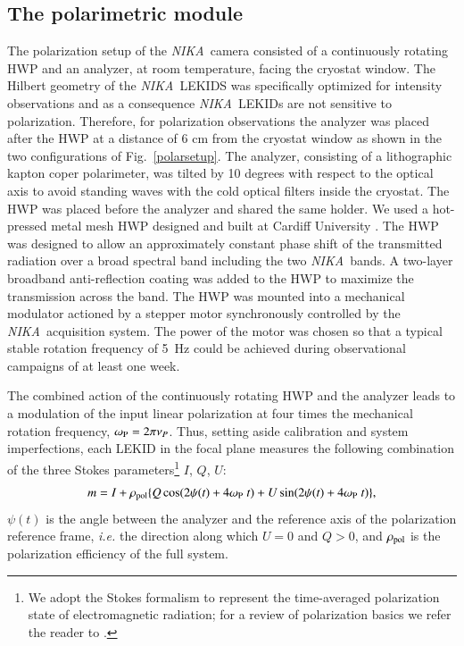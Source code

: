 \documentclass[twocolumn, traditabstract]{aa}
\newcommand{\nika}{{\it NIKA}}
\begin{document}
\subsection{The polarimetric module}
\label{sec:pol_module}
The polarization setup of the \nika\ camera consisted of a continuously rotating
HWP and an analyzer, at room temperature, facing the cryostat window. The
Hilbert geometry \citep{roesch} of the \nika\ LEKIDS was specifically optimized
for intensity observations and as a consequence \nika\ LEKIDs are not sensitive
to polarization. Therefore, for polarization observations the analyzer was placed
after the HWP at a distance of 6 cm from the cryostat window as shown in the two
configurations of Fig.~\ref{polarsetup}. The analyzer, consisting of a
lithographic kapton coper polarimeter, was tilted by 10 degrees with
respect to the optical axis to avoid standing waves with the cold optical
filters inside the cryostat. The HWP was placed before the analyzer and
  shared the same holder.  We used a hot-pressed metal mesh HWP designed and
built at Cardiff University \citep{pisano}. The HWP was designed to
allow an approximately constant phase shift of the transmitted radiation
over a broad spectral band including the two \nika\ bands. A two-layer broadband
anti-reflection coating was added to the HWP to maximize the transmission across
the band. The HWP was mounted into a mechanical modulator actioned by a stepper
motor synchronously controlled by the \nika\ acquisition system. The power of
the motor was chosen so that a typical stable rotation frequency of 5~Hz could
be achieved during observational campaigns of at least one week. 

The combined action of the continuously rotating HWP and the analyzer leads to a
modulation of the input linear polarization at four times the mechanical
rotation frequency, $\omega_{\rm P} = 2 \pi \nu_{P}$. Thus, setting aside
calibration and system imperfections, each LEKID in the focal plane measures the
following combination of the three Stokes parameters\footnote{We adopt the Stokes formalism to represent the time-averaged polarization state of electromagnetic radiation; for a review of polarization basics we refer the reader to \cite{1992plfa.book.....C}.} $I$, $Q$, $U$:
\begin{equation}
m = I + \rho_{\rm pol} \lbrace Q \cos ( 2 \psi(t) + 4 \omega_{\rm P} \ t) + U \sin ( 2\psi(t) + 4 \omega_{\rm P} \ t) \rbrace,
\label{photoequ}
\end{equation}
$\psi(t)$ is the angle between the analyzer and the reference axis of the polarization reference
frame, {\it i.e.} the direction along which $U=0$ and $Q>0$, and 
$\rho_{\rm pol}$ is the polarization efficiency of the full system. 
\end{document}
